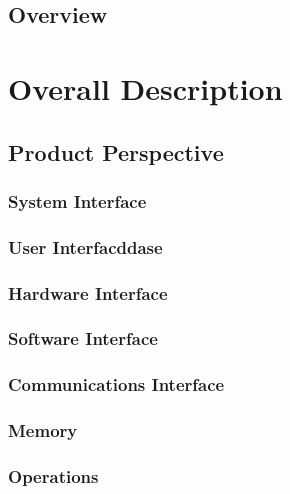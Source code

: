 \documentclass[12pt]{article}
\begin{document}
{        \subsection{Overview}
			


\pagebreak
	\section{Overall Description}


        \subsection{Product Perspective}


        	\subsubsection{System Interface}


            \subsubsection{User Interfacddase}



            \subsubsection{Hardware Interface}
		

            \subsubsection{Software Interface}
				

            \subsubsection{Communications Interface}


            \subsubsection{Memory}
		

            \subsubsection{Operations}
				

}
\end{document}
